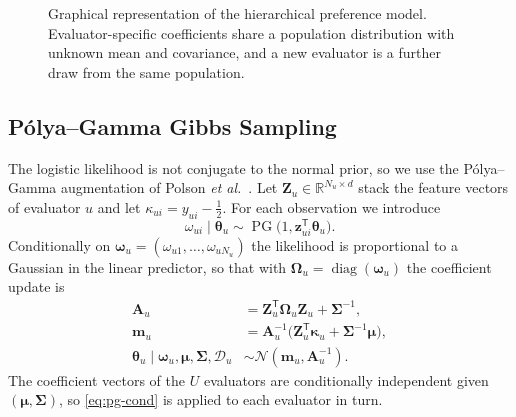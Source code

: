 \documentclass[lettersize,journal]{IEEEtran}
\newif\ifdraftnotes
\newcommand{\draftnote}[1]{\ifdraftnotes\textcolor{red}{\textbf{[TODO: #1]}}\fi}
\newcommand{\R}{\mathbb{R}}
\newcommand{\Normal}{\mathcal{N}}
\newcommand{\PG}{\operatorname{PG}}
\newcommand{\diag}{\operatorname{diag}}
\newcommand{\T}{\mathsf{T}}
\newcommand{\D}{\mathcal{D}}
\newcommand{\newuser}{\star}
\begin{document}
\begin{figure}[t]
\centering
\draftnote{Plate diagram: NIW hyperparameters $\to(\bm\mu,\bm\Sigma)\to\bm\theta_u$; $\bm z_{ui}\to y_{ui}$ inside the episode plate; a separate plate for the new evaluator $\newuser$ sharing $(\bm\mu,\bm\Sigma)$; the inclusion variables of Section~\ref{sec:pip} shown as an optional layer.}
\caption{Graphical representation of the hierarchical preference model. Evaluator-specific coefficients share a population distribution with unknown mean and covariance, and a new evaluator is a further draw from the same population.}
\label{fig:graphical-model}
\end{figure}

\subsection{P\'{o}lya--Gamma Gibbs Sampling}
\label{sec:gibbs}

The logistic likelihood is not conjugate to the normal prior, so we use the P\'{o}lya--Gamma augmentation of Polson \emph{et al.}~\cite{polson2013pg}. Let $\bm Z_u\in\R^{N_u\times d}$ stack the feature vectors of evaluator $u$ and let $\kappa_{ui}=y_{ui}-\tfrac12$. For each observation we introduce
\begin{equation}
 \omega_{ui}\mid\bm\theta_u\sim\PG\!\big(1,\bm z_{ui}^{\T}\bm\theta_u\big).
 \label{eq:pg}
\end{equation}
Conditionally on $\bm\omega_u=(\omega_{u1},\ldots,\omega_{uN_u})$ the likelihood is proportional to a Gaussian in the linear predictor, so that with $\bm\Omega_u=\diag(\bm\omega_u)$ the coefficient update is
\begin{align}
 \bm A_u&=\bm Z_u^{\T}\bm\Omega_u\bm Z_u+\bm\Sigma^{-1},\label{eq:pg-prec}\\
 \bm m_u&=\bm A_u^{-1}\big(\bm Z_u^{\T}\bm\kappa_u+\bm\Sigma^{-1}\bm\mu\big),\label{eq:pg-mean}\\
 \bm\theta_u\mid\bm\omega_u,\bm\mu,\bm\Sigma,\D_u&\sim\Normal(\bm m_u,\bm A_u^{-1}).\label{eq:pg-cond}
\end{align}
The coefficient vectors of the $U$ evaluators are conditionally independent given $(\bm\mu,\bm\Sigma)$, so \eqref{eq:pg-cond} is applied to each evaluator in turn.
\end{document}
